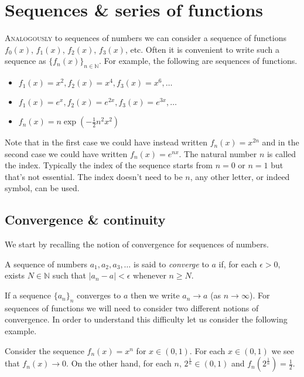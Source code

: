 \chapter{Sequences \& series of functions}

\lettrine{A}{nalogously} to sequences of numbers we can consider a sequence of functions \(f_0(x)\), \(f_1(x)\), \(f_2(x)\), \(f_3(x)\), etc.
Often it is convenient to write such a sequence as \({\{ f_n(x)\}}_{n\in \mathbb{N}}\).
For example, the following are sequences of functions.
\begin{itemize}
  \item \(f_1(x) = x^2, f_2(x)=x^4, f_3(x)=x^6,\ldots \)
  \item \(f_1(x) = e^x, f_2(x)=e^{2x}, f_3(x)=e^{3x},\ldots \)
  \item \(f_n(x) = n \exp \left( - \frac{1}{2}n^2 x^2 \right)\)
\end{itemize}

Note that in the first case we could have instead written \(f_n(x) = x^{2n}\) and in the second case we could have written  \(f_n(x) = e^{nx}\).
The natural number \(n\) is called the index.
Typically the index of the sequence starts from \(n=0\) or \(n=1\) but that's not essential.
The index doesn't need to be \(n\), any other letter, or indeed symbol, can be used.


\section{Convergence \& continuity}

We start by recalling the notion of convergence for sequences of numbers.

\begin{definition}
  A sequence of numbers  \(a_1, a_2, a_3,\ldots \) is said to \emph{converge} to \(a\) if, for each \(\epsilon>0\), exists \(N\in \mathbb{N}\) such that \(|a_n - a| < \epsilon\) whenever \(n\geq N\).
\end{definition}
%
\noindent
If a sequence \({\{a_n\}}_{n}\) converges to \(a\) then we write \(a_n \to a\) (as \(n\to \infty\)).
For sequences of functions we will need to consider two different notions of convergence.
In order to understand this difficulty let us consider the following example.

\begin{example*}
  Consider the sequence \(f_n(x) = x^n\) for \(x\in (0,1)\).
  For each \(x\in (0,1)\) we see that \(f_n(x) \to 0\).
  On the other hand, for each \(n\), \(2^{\frac{1}{n}}\in (0,1)\) and \(f_n(2^{\frac{1}{n}}) = \frac{1}{2}\).
\end{example*}


